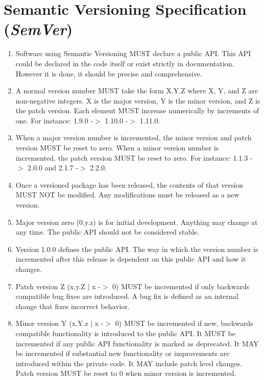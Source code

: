 \section{Semantic Versioning Specification (\emph{SemVer})}

\begin{enumerate}
  \item
    Software using Semantic Versioning MUST declare a public API. This API could 
    be declared in the code itself or exist strictly in documentation. However it 
    is done, it should be precise and comprehensive.
  \item
    A normal version number MUST take the form X.Y.Z where X, Y, and Z are 
    non-negative integers. X is the major version, Y is the minor version, 
    and Z is the patch version. Each element MUST increase numerically by 
    increments of one. For instance: 1.9.0 -$>$ 1.10.0 -$>$ 1.11.0.
  \item
    When a major version number is incremented, the minor version and patch version 
    MUST be reset to zero. When a minor version number is incremented, the patch version 
    MUST be reset to zero. For instance: 1.1.3 -$>$ 2.0.0 and 2.1.7 -$>$ 2.2.0.
  \item
    Once a versioned package has been released, the contents of that version MUST NOT 
    be modified. Any modifications must be released as a new version.
  \item
    Major version zero (0.y.z) is for initial development. Anything may change 
    at any time. The public API should not be considered stable.
  \item
    Version 1.0.0 defines the public API. The way in which the version number 
    is incremented after this release is dependent on this public API and how 
    it changes.
  \item
    Patch version Z (x.y.Z $|$ x -$>$ 0) MUST be incremented if 
    only backwards compatible bug fixes are introduced. A bug fix is defined as 
    an internal change that fixes incorrect behavior.
  \item
    Minor version Y (x.Y.z $|$ x -$>$ 0) MUST be incremented if 
    new, backwards compatible functionality is introduced to the public API. It 
    MUST be incremented if any public API functionality is marked as deprecated. 
    It MAY be incremented if substantial new functionality or improvements are 
    introduced within the private code. It MAY include patch level changes. Patch 
    version MUST be reset to 0 when minor version is incremented.

\end{enumerate}

